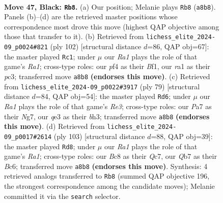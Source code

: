 \documentclass[11pt]{article}
\begin{document}
\begin{figure}[p]
\label{fig:thought-m91}
\end{figure}

\clearpage

\begin{figure}[p]\centering
\begin{subfigure}{0.46\textwidth}\centering
\resizebox{\linewidth}{!}{%
\newchessgame
\chessboard[
  setfen={r1b3k1/pqp2pp1/1p3n2/7p/1P3P1b/B3Q2P/P1B3P1/R6K b - - 2 47},
  showmover=false,
  pgfstyle=straightmove, color=movearrow, markmove={a8-b8}
]}
\caption{}
\end{subfigure}\hfill
\begin{subfigure}{0.46\textwidth}\centering
\resizebox{\linewidth}{!}{%
\newchessgame
\chessboard[
  setfen={6k1/p2q1p2/Pnb3p1/6r1/5N1p/2p1P2P/Q4PP1/R4BK1 w - - 0 52},
  showmover=false,
  pgfstyle=straightmove, color=movearrow, markmove={a1-c1}
]}
\caption{}
\end{subfigure}
\\[4pt]
\begin{subfigure}{0.46\textwidth}\centering
\resizebox{\linewidth}{!}{%
\newchessgame
\chessboard[
  setfen={6k1/1pq2pn1/2p1r3/4bp1p/P7/4BQPB/5P2/3R2K1 b - - 2 40},
  showmover=false,
  pgfstyle=straightmove, color=movearrow, markmove={e6-d6}
]}
\caption{}
\end{subfigure}\hfill
\begin{subfigure}{0.46\textwidth}\centering
\resizebox{\linewidth}{!}{%
\newchessgame
\chessboard[
  setfen={r4b1k/2q3p1/2b2p1p/p3p3/P1P5/1QB1P2P/R2N1PP1/6K1 b - - 32 52},
  showmover=false,
  pgfstyle=straightmove, color=movearrow, markmove={a8-d8}
]}
\caption{}
\end{subfigure}
\caption{\textbf{Move 47, Black: \texttt{Rb8}.} (a) Our position; Melanie plays \texttt{Rb8} (\texttt{a8b8}). Panels (b)--(d) are the retrieved master positions whose correspondence most drove this move (highest QAP objective among those that transfer to it). (b) Retrieved from \texttt{lichess\_elite\_2024-09\_p0024\#821} (ply 102) [structural distance $d$=86, QAP obj=67]: the master played \texttt{Rc1}; under $\mu$ our \emph{Ra1} plays the role of that game's \emph{Ra1}; cross-type roles: our \emph{p}f4 as their \emph{B}f1, our \emph{r}a1 as their \emph{p}c3; transferred move \texttt{a8b8} \textbf{(endorses this move)}. (c) Retrieved from \texttt{lichess\_elite\_2024-09\_p0022\#3917} (ply 79) [structural distance $d$=84, QAP obj=54]: the master played \texttt{Rd6}; under $\mu$ our \emph{Ra1} plays the role of that game's \emph{Re3}; cross-type roles: our \emph{P}a7 as their \emph{N}g7, our \emph{q}e3 as their \emph{b}h3; transferred move \texttt{a8b8} \textbf{(endorses this move)}. (d) Retrieved from \texttt{lichess\_elite\_2024-09\_p0017\#2614} (ply 103) [structural distance $d$=88, QAP obj=39]: the master played \texttt{Rd8}; under $\mu$ our \emph{Ra1} plays the role of that game's \emph{Ra1}; cross-type roles: our \emph{B}c8 as their \emph{Q}c7, our \emph{Q}b7 as their \emph{B}c6; transferred move \texttt{a8b8} \textbf{(endorses this move)}. Synthesis: 4 retrieved analogs transferred to \texttt{Rb8} (summed QAP objective 196, the strongest correspondence among the candidate moves); Melanie committed it via the \texttt{search} selector.}

\end{figure}
\end{document}
